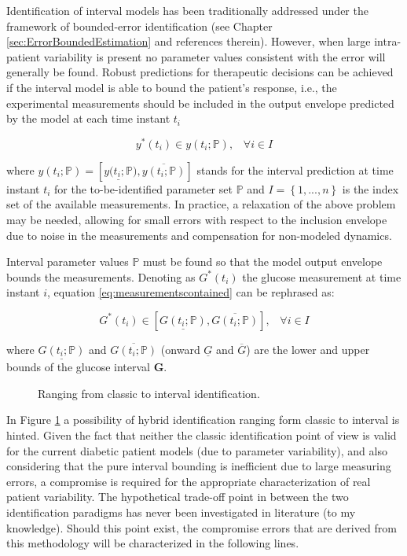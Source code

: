 Identification of interval models has been traditionally addressed under the framework of bounded-error identification (see Chapter \ref{sec:ErrorBoundedEstimation} and references therein). However, when large intra-patient variability is present no parameter values consistent with the error will generally be found. Robust predictions for therapeutic decisions can be achieved if the interval model is able to bound the patient's response, i.e., the experimental measurements should be included in the output envelope predicted by the model at each time instant $t_i$

\begin{equation}
y^{\ast}(t_i) \in y(t_i ;\mathbb{P}), \;\;\; \forall i \in I
\label{eq:measurementscontained}
\end{equation}
	
where $y(t_i ;\mathbb{P})=[\underline{y(t_i ;\mathbb{P}}),\overline{y(t_i ;\mathbb{P})}]$ stands for the interval prediction at time instant $t_i$ for the to-be-identified parameter set $\mathbb{P}$ and $I=\left\{1,...,n\right\}$ is the index set of the available measurements. In practice, a relaxation of the above problem may be needed, allowing for small errors with respect to the inclusion envelope due to noise in the measurements and compensation for non-modeled dynamics. 

Interval parameter values $\mathbb{P}$ must be found so that the model output envelope bounds the measurements. Denoting as $G^{\ast}(t_i)$ the glucose measurement at time instant $i$, equation \eqref{eq:measurementscontained} can be rephrased as:

\begin{equation}
G^{\ast}(t_i) \in [\underline{G(t_i;\mathbb{P})},\overline{G(t_i;\mathbb{P})}], \;\;\; \forall i \in I
\label{eq:measurementscontained2}
\end{equation}

where $\underline{G(t_i;\mathbb{P})}$ and $\overline{G(t_i;\mathbb{P})}$ (onward $\underline{G}$ and $\overline{G}$) are the lower and upper bounds of the glucose interval $\boldsymbol{G}$.

\begin{figure}[hbtp]
\centering
{}\caption{Ranging from classic to interval identification.}
\label{fig:espectro}
\end{figure}

In Figure \ref{fig:espectro} a possibility of hybrid identification ranging form classic to interval is hinted. Given the fact that neither the classic identification point of view is valid for the current diabetic patient models (due to parameter variability), and also considering that the pure interval bounding is inefficient due to large measuring errors, a compromise is required for the appropriate characterization of real patient variability. The hypothetical trade-off point in between the two identification paradigms has never been investigated in literature (to my knowledge). Should this point exist, the compromise errors that are derived from this methodology will be characterized in the following lines.

